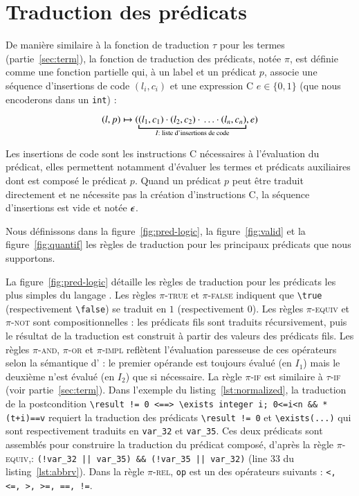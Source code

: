 \section{Traduction des prédicats \eacsl}
\label{sec:pred}


De manière similaire à la fonction de traduction $\tau$ pour les termes
(partie~\ref{sec:term}), la fonction de traduction des prédicats, notée $\pi$,
est définie comme une fonction partielle qui, à un label et un prédicat \eacsl
$p$, associe une séquence d'insertions de code $(l_i, c_i)$ et une expression C
$e \in \{0, 1\}$ (que nous encoderons dans un \lstinline'int') :

\[
(l, p) \rulearrow (\underbracket{(l_1, c_1) \concat (l_2, c_2) \concat \ldots
  \concat (l_n, c_n)}_{I : \text{ liste d'insertions de code}}, e)
\]

Les insertions de code sont les instructions C nécessaires à l'évaluation du
prédicat, elles permettent notamment d'évaluer les termes et prédicats
auxiliaires dont est composé le prédicat $p$.
Quand un prédicat $p$ peut être traduit directement et ne nécessite pas la
création d'instructions C, la séquence d'insertions est vide et notée
$\epsilon$.

Nous définissons dans la figure~\ref{fig:pred-logic}, la figure~\ref{fig:valid}
et la figure~\ref{fig:quantif} les règles de traduction pour les principaux
prédicats \eacsl que nous supportons.

La figure~\ref{fig:pred-logic} détaille les règles de traduction pour les
prédicats les plus simples du langage \eacsl.
Les règles \textsc{$\pi$-true} et \textsc{$\pi$-false} indiquent que
\lstinline'\true' (respectivement \lstinline'\false') se traduit en $1$
(respectivement $0$).
Les règles \textsc{$\pi$-equiv} et \textsc{$\pi$-not} sont compositionnelles :
les prédicats fils sont traduits récursivement, puis le résultat de la
traduction est construit à partir des valeurs des prédicats fils.
Les règles \textsc{$\pi$-and}, \textsc{$\pi$-or} et \textsc{$\pi$-impl}
reflètent l'évaluation paresseuse de ces opérateurs selon la sémantique d'\eacsl
: le premier opérande est toujours évalué (en $I_1$) mais le deuxième n'est
évalué (en $I_2$) que si nécessaire.
La règle \textsc{$\pi$-if} est similaire à \textsc{$\tau$-if} (voir
partie~\ref{sec:term}).
Dans l'exemple du listing~\ref{lst:normalized}, la traduction de la
postcondition
\lstinline{\result != 0 <==> \exists integer i; 0<=i<n && *(t+i)==v} requiert
la traduction des prédicats \lstinline|\result != 0| et
\lstinline{\exists(...)} qui sont respectivement traduits en \lstinline|var_32|
et \lstinline|var_35|.
Ces deux prédicats sont assemblés pour construire la traduction du prédicat
composé, d'après la règle \textsc{$\pi$-equiv},:
\lstinline{(!var_32 || var_35) && (!var_35 || var_32)} (line 33 du
listing~\ref{lst:abbrv}).
Dans la règle \textsc{$\pi$-rel}, \lstinline|op| est un des opérateurs suivants
: \lstinline[style=c]{<, <=, >, >=, ==, !=}.

